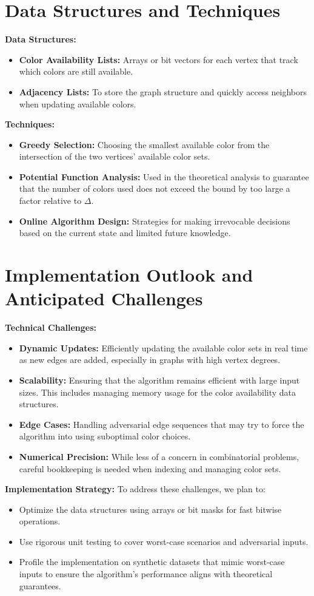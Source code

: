 \documentclass[11pt]{article}
\begin{document}
\section{Data Structures and Techniques}
\textbf{Data Structures:}
\begin{itemize}[noitemsep]
    \item \textbf{Color Availability Lists:} Arrays or bit vectors for each vertex that track which colors are still available.
    \item \textbf{Adjacency Lists:} To store the graph structure and quickly access neighbors when updating available colors.
\end{itemize}

\textbf{Techniques:}
\begin{itemize}[noitemsep]
    \item \textbf{Greedy Selection:} Choosing the smallest available color from the intersection of the two vertices’ available color sets.
    \item \textbf{Potential Function Analysis:} Used in the theoretical analysis to guarantee that the number of colors used does not exceed the bound by too large a factor relative to \(\Delta\).
    \item \textbf{Online Algorithm Design:} Strategies for making irrevocable decisions based on the current state and limited future knowledge.
\end{itemize}

\section{Implementation Outlook and Anticipated Challenges}
\textbf{Technical Challenges:}
\begin{itemize}[noitemsep]
    \item \textbf{Dynamic Updates:} Efficiently updating the available color sets in real time as new edges are added, especially in graphs with high vertex degrees.
    \item \textbf{Scalability:} Ensuring that the algorithm remains efficient with large input sizes. This includes managing memory usage for the color availability data structures.
    \item \textbf{Edge Cases:} Handling adversarial edge sequences that may try to force the algorithm into using suboptimal color choices.
    \item \textbf{Numerical Precision:} While less of a concern in combinatorial problems, careful bookkeeping is needed when indexing and managing color sets.
\end{itemize}

\textbf{Implementation Strategy:}  
To address these challenges, we plan to:
\begin{itemize}[noitemsep]
    \item Optimize the data structures using arrays or bit masks for fast bitwise operations.
    \item Use rigorous unit testing to cover worst-case scenarios and adversarial inputs.
    \item Profile the implementation on synthetic datasets that mimic worst-case inputs to ensure the algorithm’s performance aligns with theoretical guarantees.
\end{itemize}
\end{document}
